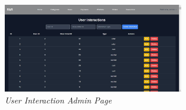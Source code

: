 \documentclass[journal,article,submit,pdftex,moreauthors]{Definitions/mdpi}
\begin{document}
\begin{figure}[H]
    \centering
    \includegraphics[width=0.7\textwidth]{images/userInteractionPageAdmin.jpeg}
    \captionsetup{justification=centering}
    \caption{\textit{User Interaction Admin Page}}
    \label{fig:activity-login}
\end{figure}
\end{document}
